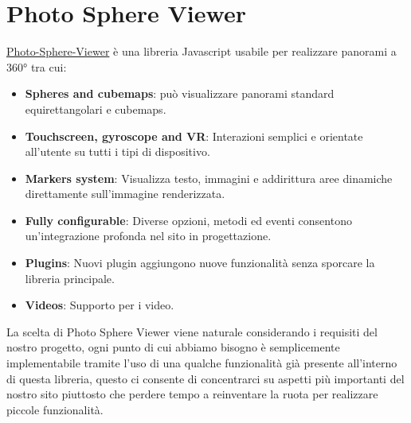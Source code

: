 \documentclass[a4paper,12pt]{report}
\newcommand{\photosphereviewer}{\href{https://photo-sphere-viewer.js.org/}{Photo-Sphere-Viewer} }
\begin{document}
\section{Photo Sphere Viewer}
\photosphereviewer è una libreria Javascript usabile per realizzare panorami a 360° tra cui:
\begin{itemize}
    \item \textbf{Spheres and cubemaps}: può visualizzare panorami standard equirettangolari e cubemaps.
    \item \textbf{Touchscreen, gyroscope and VR}: Interazioni semplici e orientate all'utente su tutti i tipi di dispositivo.
    \item \textbf{Markers system}: Visualizza testo, immagini e addirittura aree dinamiche direttamente sull'immagine renderizzata.
    \item \textbf{Fully configurable}: Diverse opzioni, metodi ed eventi consentono un'integrazione profonda nel sito in progettazione.
    \item \textbf{Plugins}: Nuovi plugin aggiungono nuove funzionalità senza sporcare la libreria principale.
    \item \textbf{Videos}: Supporto per i video.
\end{itemize}
La scelta di Photo Sphere Viewer viene naturale considerando i requisiti del nostro progetto, ogni punto di cui abbiamo bisogno è semplicemente implementabile tramite l'uso di una qualche funzionalità già presente all'interno di questa libreria, questo ci consente di concentrarci su aspetti più importanti del nostro sito piuttosto che perdere tempo a reinventare la ruota per realizzare piccole funzionalità.
\end{document}
